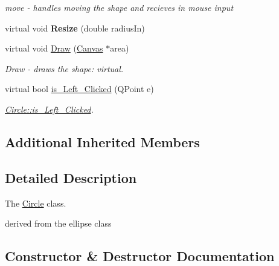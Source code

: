 \begin{DoxyCompactItemize}
\begin{DoxyCompactList}\small\item\em move -\/ handles moving the shape and recieves in mouse input \end{DoxyCompactList}\item 
\mbox{\label{class_circle_a1d04f83b447f9e4a03cca186b929e083}} 
virtual void {\bfseries Resize} (double radius\+In)
\item 
virtual void \hyperlink{class_circle_a5bebd94955572edce0ad10208a449772}{Draw} (\hyperlink{class_canvas}{Canvas} $\ast$area)
\begin{DoxyCompactList}\small\item\em Draw -\/ draws the shape\+: virtual. \end{DoxyCompactList}\item 
virtual bool \hyperlink{class_circle_a1661bb4e324cce0196a6aa1195c26c73}{is\+\_\+\+Left\+\_\+\+Clicked} (Q\+Point e)
\begin{DoxyCompactList}\small\item\em \hyperlink{class_circle_a1661bb4e324cce0196a6aa1195c26c73}{Circle\+::is\+\_\+\+Left\+\_\+\+Clicked}. \end{DoxyCompactList}\end{DoxyCompactItemize}
\subsection*{Additional Inherited Members}


\subsection{Detailed Description}
The \hyperlink{class_circle}{Circle} class. 


\begin{DoxyItemize}
\item derived from the ellipse class 
\end{DoxyItemize}

\subsection{Constructor \& Destructor Documentation}
\mbox{\label{class_circle_a4b41e38613114920686bbfea15ded361}} 
